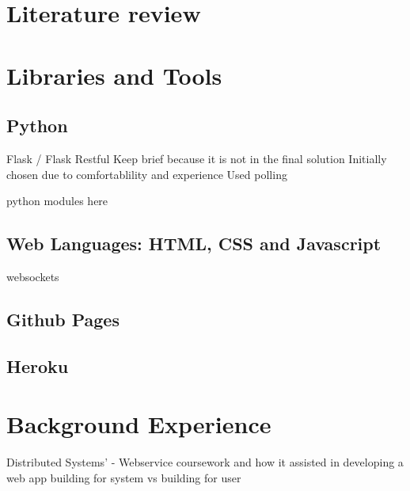 \section{Literature review}

\section{Libraries and Tools}

\subsection{Python}

Flask / Flask Restful\linebreak
Keep brief because it is not in the final solution\linebreak
Initially chosen due to comfortablility and experience\linebreak
Used polling

python modules here

\subsection{Web Languages: HTML, CSS and Javascript}

websockets

\subsection{Github Pages}

\subsection{Heroku}

\section{Background Experience}

Distributed Systems' - Webservice coursework and how it assisted in developing a web app
building for system vs building for user
